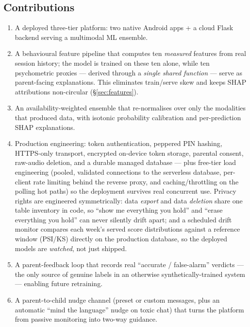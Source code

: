 \documentclass[11pt,a4paper]{article}
\begin{document}
\subsection*{Contributions}
\begin{enumerate}[leftmargin=1.4em]
  \item A deployed three-tier platform: two native Android apps + a cloud Flask
        backend serving a multimodal ML ensemble.
  \item A behavioural feature pipeline that computes ten \emph{measured} features
        from real session history; the model is trained on these ten alone, while ten
        psychometric proxies --- derived through a \emph{single shared function} ---
        serve as parent-facing explanations. This eliminates train/serve skew and
        keeps SHAP attributions non-circular (\S\ref{sec:features}).
  \item An availability-weighted ensemble that re-normalises over only the
        modalities that produced data, with isotonic probability calibration and
        per-prediction SHAP explanations.
  \item Production engineering: token authentication, peppered PIN hashing,
        HTTPS-only transport, encrypted on-device token storage, parental consent,
        raw-audio deletion, and a durable managed database --- plus free-tier load
        engineering (pooled, validated connections to the serverless database,
        per-client rate limiting behind the reverse proxy, and caching/throttling on
        the polling hot paths) so the deployment survives real concurrent use.
        Privacy rights are engineered symmetrically: data \emph{export} and data
        \emph{deletion} share one table inventory in code, so ``show me everything you
        hold'' and ``erase everything you hold'' can never silently drift apart; and a
        scheduled drift monitor compares each week's served score distributions against
        a reference window (PSI/KS) directly on the production database, so the
        deployed models are \emph{watched}, not just shipped.
  \item A parent-feedback loop that records real ``accurate / false-alarm''
        verdicts --- the only source of genuine labels in an otherwise
        synthetically-trained system --- enabling future retraining.
  \item A parent-to-child nudge channel (preset or custom messages, plus an automatic
        ``mind the language'' nudge on toxic chat) that turns the platform from passive
        monitoring into two-way guidance.

\end{enumerate}
\end{document}

